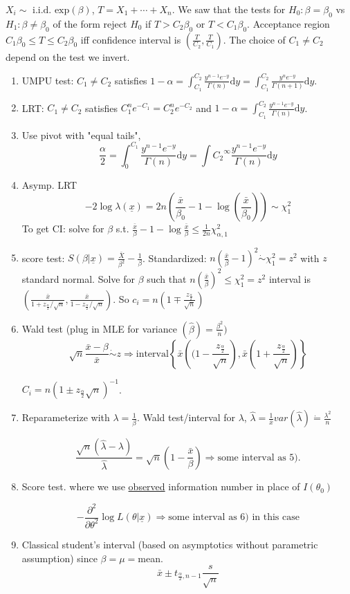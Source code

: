 \documentclass[english, 11pt]{article}
\newcommand{\lp}{\left(}
\newcommand{\rp}{\right)}
\begin{document}
\begin{exmp}\label{exmp:612}
$X_i\sim\text{ i.i.d. exp}(\beta)$, $T=X_1+\cdots+X_n$. We saw that the tests for $H_0:\beta=\beta_0$ vs $H_1:\beta\not=\beta_0$ of the form reject $H_0$ if $T>C_2\beta_0$ or $T<C_1\beta_0$. Acceptance region $C_1\beta_0\leqslant T\leqslant C_2\beta_0$ iff confidence interval is $\lp\frac{T}{C_2}, \frac{T}{C_1}\rp$. The choice of $C_1\not=C_2$ depend on the test we invert.
\begin{enumerate}
\item UMPU test: $C_1\not=C_2$ satisfies $1-\alpha=\int_{C_1}^{C_2}\frac{y^{n-1}e^{-y}}{\Gamma(n)}\mathrm{d}y=\int_{C_1}^{C_2}\frac{y^ne^{-y}}{\Gamma(n+1)}\mathrm{d}y$.
\item LRT: $C_1\not=C_2$ satisfies $C_1^ne^{-C_1}=C_2^ne^{-C_2}$ and $1-\alpha=\int_{C_1}^{C_2}\frac{y^{n-1}e^{-y}}{\Gamma(n)}\mathrm{d}y$.
\item Use pivot with "equal tails", 
$$
\frac{\alpha}{2}=\int_{0}^{C_1}\frac{y^{n-1}e^{-y}}{\Gamma(n)}\mathrm{d}y=\int{C_2}^\infty\frac{y^{n-1}e^{-y}}{\Gamma(n)}\mathrm{d}y
$$
\item Asymp. LRT
$$
-2\log\lambda(\underline{x})=2n\lp\frac{\bar{x}}{\beta_0}-1-\log\lp\frac{\bar{x}}{\beta_0}\rp\rp\sim \chi^2_1
$$
To get CI:  solve for $\beta$ s.t. $\frac{\bar{x}}{\beta}-1-\log\frac{\bar{x}}{\beta}\leqslant\frac{1}{2n}\chi^2_{\alpha, 1}$
\item score test: $S(\beta|\underline{x})=\frac{\bar{X}}{\beta^2}-\frac{1}{\beta}$. Standardized: $n\lp\frac{\bar{x}}{\beta}-1\rp^2\dot{\sim}\chi^2_1=z^2$ with $z$ standard normal. Solve for $\beta$ such that $n\lp\frac{\bar{x}}{\beta}\rp^2\leqslant\chi_1^2=z^2$ interval is $\lp\frac{\bar{x}}{1+z_{\frac{\alpha}{2}}/\sqrt{n}}, \frac{\bar{x}}{1-z_{\frac{\alpha}{2}}/\sqrt{n}}\rp$. So $c_i=n\lp1\mp \frac{z_{\frac{\alpha}{2}}}{\sqrt{n}}\rp$
\item Wald test (plug in MLE for variance $(\hat{\beta})=\frac{\beta^2}{n})$
$$
\sqrt{n}\frac{\bar{x}-\beta}{\bar{x}}\dot{\sim}z\Rightarrow\text{interval} \left\{\bar{x}\lp(1-\frac{z_{\frac{\alpha}{2}}}{\sqrt{n}}\rp, \bar{x}\lp 1+\frac{z_{\frac{\alpha}{2}}}{\sqrt{n}}\rp\right\}
$$

$C_i=n\lp 1\pm z_{\frac{\alpha}{2}}\sqrt{n}\rp^{-1}$.
\item Reparameterize with $\lambda=\frac{1}{\beta}$. Wald test/interval for $\lambda$, $\hat{\lambda}=\frac{1}{\bar{x}}var(\hat{\lambda})\dot{=}\frac{\lambda^2}{n}$

$$
\frac{\sqrt{n}(\hat{\lambda}-\lambda)}{\hat{\lambda}}=\sqrt{n}\lp 1-\frac{\bar{x}}{\beta}\rp \Rightarrow \text{some interval as 5)} .
$$
\item Score test. where we use \underline{observed} information number in place of $I(\theta_0)$

$$
-\frac{\partial^2}{\partial \theta^2}\log L(\theta|\underline{x})\Rightarrow \text{some interval as 6) in this case}
$$
\item Classical student's interval (based on asymptotics without parametric assumption) since $\beta=\mu=$mean.
$$
\bar{x}\pm t_{\frac{\alpha}{2}, n-1}\frac{s}{\sqrt{n}}
$$
\end{enumerate}
\end{exmp}
\end{document}
